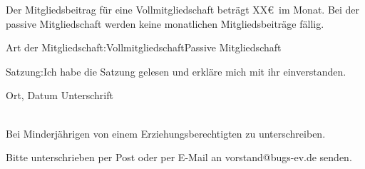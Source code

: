 \documentclass[ngerman]{scrartcl}
\newcommand{\smallSquare}{\fbox{\phantom{\rule{0.15in}{0.15in}}}}
\begin{document}
\begin{center}
Der Mitgliedsbeitrag f\"ur eine Vollmitgliedschaft betr\"agt XX\euro\ im Monat. Bei der passive Mitgliedschaft werden keine monatlichen Mitgliedsbeitr\"age f\"allig.
\end{center}

\vspace{2ex}

Art der Mitgliedschaft:\hspace{2ex}\smallSquare\hspace{2ex}Vollmitgliedschaft\hspace{6ex}\smallSquare\hspace{2ex}Passive Mitgliedschaft

\vspace{4ex}
Satzung:\hspace{4ex}\smallSquare\hspace{2ex}Ich habe die Satzung gelesen und erkl\"are mich mit ihr einverstanden.

\vspace{18ex}

Ort, Datum \uline{\hfill}  Unterschrift \uline{\phantom{xxxxxxxxxxxxxxxxxxxxxxxxxxxxxxxxxx}}\\
\phantom{xxxxxxxxxxxxxxxxxxxxxxxxx}\\
\begin{center}\small{Bei Minderj\"ahrigen von einem Erziehungsberechtigten zu unterschreiben.}\end{center}
\vspace{4ex}
\small Bitte unterschrieben per Post oder per E-Mail an vorstand@bugs-ev.de senden.
\end{document}
